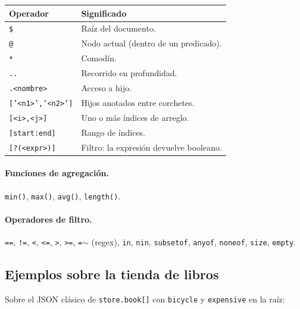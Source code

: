 \documentclass[11pt,a4paper]{article}
\begin{document}
\begin{center}
\begin{tabular}{ll}
\toprule
Operador & Significado \\
\midrule
\texttt{\$}                & Raíz del documento. \\
\texttt{@}                 & Nodo actual (dentro de un predicado). \\
\texttt{*}                 & Comodín. \\
\texttt{..}                & Recorrido en profundidad. \\
\texttt{.<nombre>}         & Acceso a hijo. \\
\texttt{['<n1>','<n2>']}   & Hijos anotados entre corchetes. \\
\texttt{[<i>,<j>]}         & Uno o más índices de arreglo. \\
\texttt{[start:end]}       & Rango de índices. \\
\texttt{[?(<expr>)]}       & Filtro: la expresión devuelve booleano. \\
\bottomrule
\end{tabular}
\end{center}

\paragraph{Funciones de agregación.} \texttt{min()}, \texttt{max()},
\texttt{avg()}, \texttt{length()}.

\paragraph{Operadores de filtro.} \texttt{==}, \texttt{!=}, \texttt{<},
\texttt{<=}, \texttt{>}, \texttt{>=}, \texttt{=$\sim$} (regex),
\texttt{in}, \texttt{nin}, \texttt{subsetof}, \texttt{anyof},
\texttt{noneof}, \texttt{size}, \texttt{empty}.

\subsection{Ejemplos sobre la tienda de libros}

Sobre el JSON clásico de \texttt{store.book[]} con \texttt{bicycle} y
\texttt{expensive} en la raíz:
\end{document}
